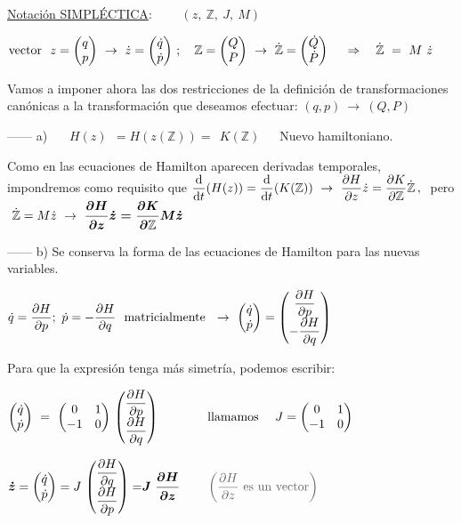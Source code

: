 \underline{Notación SIMPLÉCTICA}: \textcolor{gris}{$\qquad (z,\ \mathbb Z,\ J,\ M)$}

$ \text{vector } \ z=\mqty(q\\ p) \ \to \ \dot z=\mqty(\dot q\\ \dot p)\ ; \quad \mathbb{Z}=\mqty(Q\\P) \ \to \ \dot {\mathbb{Z}}= \mqty(\dot Q\\ \dot P) \ \quad \Rightarrow \quad \dot{ \mathbb{Z}} \ = \ M\ \dot z$

Vamos a imponer ahora las dos restricciones de la definición de transformaciones canónicas a la transformación que deseamos efectuar:  $(q,p) \ \to \ (Q,P)$

\vspace{5mm}
------  a) $\ \quad \boxed{ \ H(z) \ } \ = H(z(\mathbb{Z}))=\ \boxed{\ K(\mathbb Z)\ } \quad $ Nuevo hamiltoniano.

Como en las ecuaciones de Hamilton aparecen derivadas temporales, impondremos como requisito que $\displaystyle \dv{t} (H(z))=\dv{t} (K(\mathbb Z)) \ \to \ \pdv{H}{z} \dot z = \pdv{K}{\mathbb Z} \dot {\mathbb Z}\, , \ $ pero $\ \dot{\mathbb Z}=M \dot z \ \to \ \displaystyle \boldsymbol{\pdv{H}{z} \dot z = \pdv{K}{\mathbb Z} M \dot z}$

\vspace{5mm}
------  b) Se conserva la forma de las ecuaciones de Hamilton para las nuevas variables.

$\displaystyle \dot q =\pdv{H}{p};\ \dot p=-\pdv{H}{q} \ \text{ matricialmente } \ \to \ \mqty(\dot q \\ \dot p )=\mqty(\displaystyle \pdv{H}{p} \\ \displaystyle -\pdv{H}{q} )$ 

Para que la expresión tenga más simetría, podemos escribir:

$\mqty(\dot q \\ \dot p )\ = \ \mqty(0&1\\-1&0)\  \mqty(\displaystyle \pdv{H}{p} \\  \displaystyle  \pdv{H}{q} ) \qquad \qquad \text{llamamos } \quad J=\mqty(0&1\\-1&0)$


 $ \boldsymbol{ \dot z} =\mqty(\dot q \\ \dot p )=J\ \mqty(\displaystyle \pdv{H}{q} \\ \displaystyle \pdv{H}{p} ) =\displaystyle \boldsymbol{J \ \pdv{H}{z}} \qquad  \textcolor{gris}{\left( \pdv{H}{z} \text{ es un vector} \right)} \quad $ 
 
